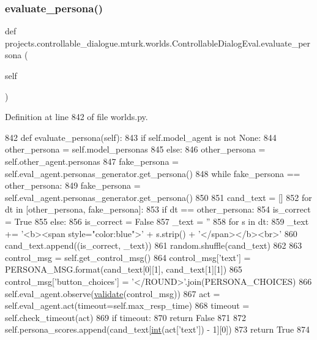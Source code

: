 \subsubsection{\texorpdfstring{evaluate\+\_\+persona()}{evaluate\_persona()}}
{\footnotesize\ttfamily def projects.\+controllable\+\_\+dialogue.\+mturk.\+worlds.\+Controllable\+Dialog\+Eval.\+evaluate\+\_\+persona (\begin{DoxyParamCaption}\item[{}]{self }\end{DoxyParamCaption})}



Definition at line 842 of file worlds.\+py.


\begin{DoxyCode}
842     \textcolor{keyword}{def }evaluate\_persona(self):
843         \textcolor{keywordflow}{if} self.model\_agent \textcolor{keywordflow}{is} \textcolor{keywordflow}{not} \textcolor{keywordtype}{None}:
844             other\_persona = self.model\_personas
845         \textcolor{keywordflow}{else}:
846             other\_persona = self.other\_agent.personas
847         fake\_persona = self.eval\_agent.personas\_generator.get\_persona()
848         \textcolor{keywordflow}{while} fake\_persona == other\_persona:
849             fake\_persona = self.eval\_agent.personas\_generator.get\_persona()
850 
851         cand\_text = []
852         \textcolor{keywordflow}{for} dt \textcolor{keywordflow}{in} [other\_persona, fake\_persona]:
853             \textcolor{keywordflow}{if} dt == other\_persona:
854                 is\_correct = \textcolor{keyword}{True}
855             \textcolor{keywordflow}{else}:
856                 is\_correct = \textcolor{keyword}{False}
857             \_text = \textcolor{stringliteral}{''}
858             \textcolor{keywordflow}{for} s \textcolor{keywordflow}{in} dt:
859                 \_text += \textcolor{stringliteral}{'<b><span style="color:blue">'} + s.strip() + \textcolor{stringliteral}{'</span></b><br>'}
860             cand\_text.append((is\_correct, \_text))
861         random.shuffle(cand\_text)
862 
863         control\_msg = self.get\_control\_msg()
864         control\_msg[\textcolor{stringliteral}{'text'}] = PERSONA\_MSG.format(cand\_text[0][1], cand\_text[1][1])
865         control\_msg[\textcolor{stringliteral}{'button\_choices'}] = \textcolor{stringliteral}{'</ROUND>'}.join(PERSONA\_CHOICES)
866         self.eval\_agent.observe(\hyperlink{namespaceparlai_1_1core_1_1worlds_afc3fad603b7bce41dbdc9cdc04a9c794}{validate}(control\_msg))
867         act = self.eval\_agent.act(timeout=self.max\_resp\_time)
868         timeout = self.check\_timeout(act)
869         \textcolor{keywordflow}{if} timeout:
870             \textcolor{keywordflow}{return} \textcolor{keyword}{False}
871 
872         self.persona\_scores.append(cand\_text[\hyperlink{namespacelanguage__model_1_1eval__ppl_a7d12ee00479673c5c8d1f6d01faa272a}{int}(act[\textcolor{stringliteral}{'text'}]) - 1][0])
873         \textcolor{keywordflow}{return} \textcolor{keyword}{True}
874 
\end{DoxyCode}
